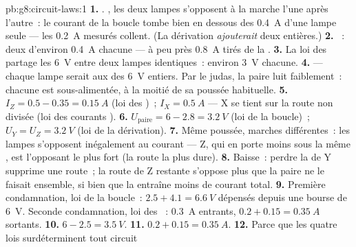 \begin{solution}{pb:g8:circuit-laws:1}
\textbf{1.} . , les deux lampes s'opposent à la
marche l'une après l'autre~: le courant de la boucle tombe bien en
dessous des \qty{0.4}{A} d'une lampe seule --- les \qty{0.2}{A}
mesurés collent. (La dérivation \emph{ajouterait} deux 
entières.)
\textbf{2.} ~: deux  d'environ \qty{0.4}{A}
chacune --- à peu près \qty{0.8}{A} tirés de la .
\textbf{3.} La loi des   partage les \qty{6}{V}
entre deux lampes identiques~: environ \qty{3}{V} chacune.
\textbf{4.}  --- chaque lampe serait aux  des
\qty{6}{V} entiers. Par le judas, la paire  luit faiblement~:
chacune est sous-alimentée, à la moitié de sa poussée habituelle.
\textbf{5.} $I_Z = 0.5 - 0.35 = \qty{0.15}{A}$ (loi des )~;
$I_X = \qty{0.5}{A}$ --- X se tient sur la route non divisée (loi des
courants ).
\textbf{6.} $U_{\text{paire}} = 6 - 2.8 = \qty{3.2}{V}$ (loi de la
boucle)~; $U_Y = U_Z = \qty{3.2}{V}$ (loi de la dérivation).
\textbf{7.} Même poussée, marches différentes~: les lampes s'opposent
inégalement au courant --- Z, qui en porte moins sous la même
, est l'opposant le plus fort (la route la plus dure).
\textbf{8.} Baisse~: perdre la  de Y supprime une route~; la
route de Z restante s'oppose plus que la paire ne le faisait
ensemble, si bien que la  entraîne moins de courant total.
\textbf{9.} Première condamnation, loi de la boucle~:
$2.5 + 4.1 = \qty{6.6}{V}$ dépensés depuis une bourse de \qty{6}{V}.
Seconde condamnation, loi des ~: \qty{0.3}{A} entrants,
$0.2 + 0.15 = \qty{0.35}{A}$ sortants.
\textbf{10.} $6 - 2.5 = \qty{3.5}{V}$.
\textbf{11.} $0.2 + 0.15 = \qty{0.35}{A}$.
\textbf{12.} Parce que les quatre lois surdéterminent tout circuit

\end{solution}
